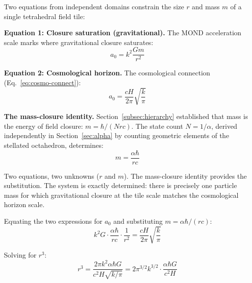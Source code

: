 \documentclass[aps,prd,preprint,superscriptaddress,showpacs,preprintnumbers,amsmath,amssymb,nofootinbib]{revtex4-2}
\begin{document}
Two equations from independent domains constrain the size $r$ and mass $m$ of a single tetrahedral field tile:

\textbf{Equation 1: Closure saturation (gravitational).} The MOND acceleration scale marks where gravitational closure saturates:
\begin{equation}
a_0 = k^2 \frac{Gm}{r^2}
\label{eq:closure-sat}
\end{equation}

\textbf{Equation 2: Cosmological horizon.} The cosmological connection (Eq.~\ref{eq:cosmo-connect}):
\begin{equation}
a_0 = \frac{cH}{2\pi} \sqrt{\frac{k}{\pi}}
\end{equation}

\textbf{The mass-closure identity.} Section~\ref{subsec:hierarchy} established that mass is the energy of field closure: $m = \hbar/(Nrc)$. The state count $N = 1/\alpha$, derived independently in Section~\ref{sec:alpha} by counting geometric elements of the stellated octahedron, determines:
\begin{equation}
m = \frac{\alpha \hbar}{rc}
\label{eq:quantum-em}
\end{equation}

Two equations, two unknowns ($r$ and $m$). The mass-closure identity provides the substitution. The system is exactly determined: there is precisely one particle mass for which gravitational closure at the tile scale matches the cosmological horizon scale.

Equating the two expressions for $a_0$ and substituting $m = \alpha\hbar/(rc)$:
\begin{equation}
k^2 G \cdot \frac{\alpha\hbar}{rc} \cdot \frac{1}{r^2} = \frac{cH}{2\pi} \sqrt{\frac{k}{\pi}}
\end{equation}

Solving for $r^3$:
\begin{equation}
r^3 = \frac{2\pi k^2 \alpha \hbar G}{c^2 H \sqrt{k/\pi}} = 2\pi^{3/2} k^{3/2} \cdot \frac{\alpha \hbar G}{c^2 H}
\end{equation}
\end{document}

